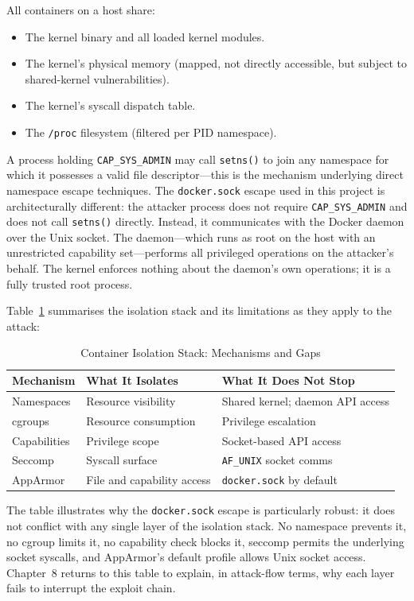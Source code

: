 All containers on a host share:

\begin{itemize}
    \item The kernel binary and all loaded kernel modules.
    \item The kernel's physical memory (mapped, not directly accessible, but subject
          to shared-kernel vulnerabilities).
    \item The kernel's syscall dispatch table.
    \item The \texttt{/proc} filesystem (filtered per PID namespace).
\end{itemize}

A process holding \texttt{CAP\_SYS\_ADMIN} may call \texttt{setns()} to join any
namespace for which it possesses a valid file descriptor---this is the mechanism
underlying direct namespace escape techniques. The \texttt{docker.sock} escape used
in this project is architecturally different: the attacker process does not require
\texttt{CAP\_SYS\_ADMIN} and does not call \texttt{setns()} directly. Instead, it
communicates with the Docker daemon over the Unix socket. The daemon---which runs as
root on the host with an unrestricted capability set---performs all privileged
operations on the attacker's behalf. The kernel enforces nothing about the daemon's
own operations; it is a fully trusted root process.

Table~\ref{tab:isolation-gaps} summarises the isolation stack and its limitations as
they apply to the attack:

\begin{table}[h]
\centering
\caption{Container Isolation Stack: Mechanisms and Gaps}
\label{tab:isolation-gaps}
\begin{tabular}{|l|l|l|}
\hline
\textbf{Mechanism} & \textbf{What It Isolates} & \textbf{What It Does Not Stop} \\
\hline
Namespaces  & Resource visibility               & Shared kernel; daemon API access \\
cgroups     & Resource consumption              & Privilege escalation             \\
Capabilities & Privilege scope                 & Socket-based API access          \\
Seccomp     & Syscall surface                   & \texttt{AF\_UNIX} socket comms   \\
AppArmor    & File and capability access        & \texttt{docker.sock} by default  \\
\hline
\end{tabular}
\end{table}

The table illustrates why the \texttt{docker.sock} escape is particularly robust: it
does not conflict with any single layer of the isolation stack. No namespace prevents
it, no cgroup limits it, no capability check blocks it, seccomp permits the
underlying socket syscalls, and AppArmor's default profile allows Unix socket access.
Chapter~8 returns to this table to explain, in attack-flow terms, why each layer
fails to interrupt the exploit chain.